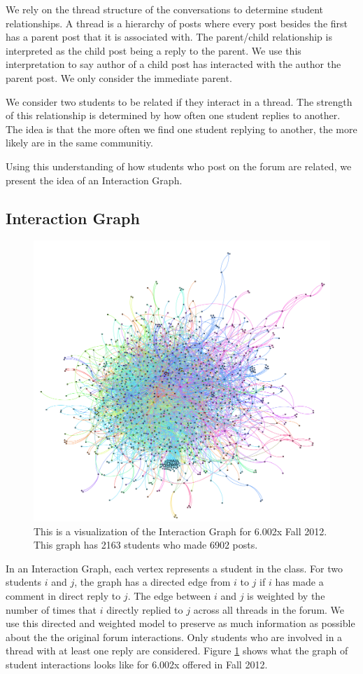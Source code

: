 We rely on the thread structure of the conversations to determine student relationships. A thread is a hierarchy of posts where every post besides the first has a parent post that it is associated with. The parent/child relationship is interpreted as the child post being a reply to the parent. We use this interpretation to say author of a child post has interacted with the author the parent post. We only consider the immediate parent. 

We consider two students to be related if they interact in a thread. The strength of this relationship is determined by how often one student replies to another. The idea is that the more often we find one student replying to another, the more likely are in the same communitiy.

Using this understanding of how students who post on the forum are related, we present the idea of an Interaction Graph. 

\subsection{Interaction Graph}
\begin{figure}[h]
  \centering
  \includegraphics[width=.7\linewidth]{interaction_graph.png}
  \caption{This is a visualization of the Interaction Graph for 6.002x Fall 2012. This graph has 2163 students who made 6902 posts.}
  \label{interactions}
\end{figure}

In an Interaction Graph, each vertex represents a student in the class. For two students $i$ and $j$, the graph has a directed edge from $i$ to $j$ if $i$ has made a comment in direct reply to $j$. The edge between $i$ and $j$ is weighted by the number of times that $i$ directly replied to $j$ across all threads in the forum. We use this directed and weighted model to preserve as much information as possible about the the original forum interactions. Only students who are involved in a thread with at least one reply are considered. Figure \ref{interactions} shows what the graph of student interactions looks like for 6.002x offered in Fall 2012.